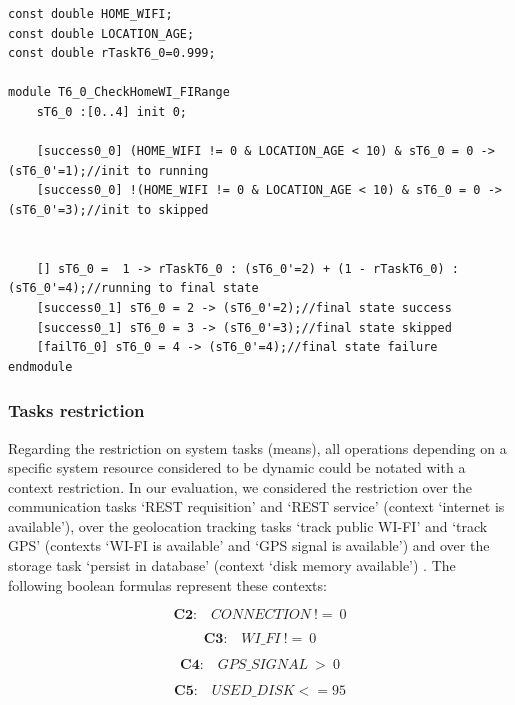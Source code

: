 \begin{lstlisting}[language=Prism, caption={Variable declaration and module representing a leaf-task from a restricted goal.},label={lst:PRISM_CTX_GOAL}]
const double HOME_WIFI;
const double LOCATION_AGE;
const double rTaskT6_0=0.999;

module T6_0_CheckHomeWI_FIRange
	sT6_0 :[0..4] init 0;
	
	[success0_0] (HOME_WIFI != 0 & LOCATION_AGE < 10) & sT6_0 = 0 -> (sT6_0'=1);//init to running
	[success0_0] !(HOME_WIFI != 0 & LOCATION_AGE < 10) & sT6_0 = 0 -> (sT6_0'=3);//init to skipped


	[] sT6_0 =  1 -> rTaskT6_0 : (sT6_0'=2) + (1 - rTaskT6_0) : (sT6_0'=4);//running to final state
	[success0_1] sT6_0 = 2 -> (sT6_0'=2);//final state success
	[success0_1] sT6_0 = 3 -> (sT6_0'=3);//final state skipped
	[failT6_0] sT6_0 = 4 -> (sT6_0'=4);//final state failure
endmodule
\end{lstlisting}

\subsubsection{Tasks restriction}

Regarding the restriction on system tasks (means), all operations depending on a specific system resource considered to be dynamic could be notated with a context restriction. In our evaluation, we considered the restriction over the communication tasks `REST requisition' and `REST service' (context `internet is available'), over the geolocation tracking tasks `track public WI-FI' and `track GPS' (contexts `WI-FI is available' and `GPS signal is available') and over the storage task `persist in database' (context `disk memory available') . The following boolean formulas represent these contexts: 

\begin{equation}\label{eq:C2}
\textbf{C2:}\quad CONNECTION\ !=\ 0 
\end{equation}

\begin{equation}\label{eq:C3}
\textbf{C3:}\quad WI\_FI\ !=\ 0
\end{equation}

\begin{equation}\label{eq:C4}
\textbf{C4:}\quad GPS\_SIGNAL\ >\ 0
\end{equation}

\begin{equation}\label{eq:C5}
\textbf{C5:}\quad USED\_DISK <= 95
\end{equation}

